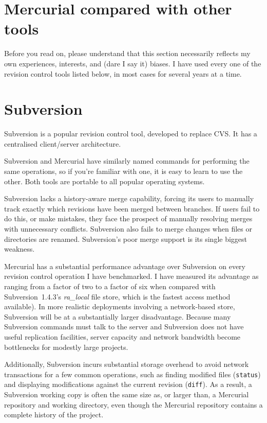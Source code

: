 \section{Mercurial compared with other tools}

Before you read on, please understand that this section necessarily
reflects my own experiences, interests, and (dare I say it) biases.  I
have used every one of the revision control tools listed below, in
most cases for several years at a time.


\section{Subversion}

Subversion is a popular revision control tool, developed to replace
CVS.  It has a centralised client/server architecture.

Subversion and Mercurial have similarly named commands for performing
the same operations, so if you're familiar with one, it is easy to
learn to use the other.  Both tools are portable to all popular
operating systems.

Subversion lacks a history-aware merge capability, forcing its users
to manually track exactly which revisions have been merged between
branches.  If users fail to do this, or make mistakes, they face the
prospect of manually resolving merges with unnecessary conflicts.
Subversion also fails to merge changes when files or directories are
renamed.  Subversion's poor merge support is its single biggest
weakness.

Mercurial has a substantial performance advantage over Subversion on
every revision control operation I have benchmarked.  I have measured
its advantage as ranging from a factor of two to a factor of six when
compared with Subversion~1.4.3's \emph{ra\_local} file store, which is
the fastest access method available).  In more realistic deployments
involving a network-based store, Subversion will be at a substantially
larger disadvantage.  Because many Subversion commands must talk to
the server and Subversion does not have useful replication facilities,
server capacity and network bandwidth become bottlenecks for modestly
large projects.

Additionally, Subversion incurs substantial storage overhead to avoid
network transactions for a few common operations, such as finding
modified files (\texttt{status}) and displaying modifications against
the current revision (\texttt{diff}).  As a result, a Subversion
working copy is often the same size as, or larger than, a Mercurial
repository and working directory, even though the Mercurial repository
contains a complete history of the project.

